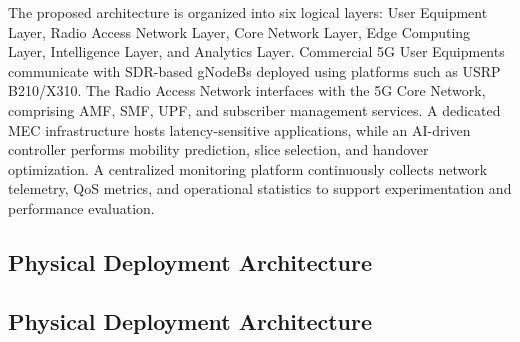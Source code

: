 \documentclass[12pt,a4paper]{article}
\begin{document}
The proposed architecture is organized into six logical layers: User Equipment Layer, Radio Access Network Layer, Core Network Layer, Edge Computing Layer, Intelligence Layer, and Analytics Layer. Commercial 5G User Equipments communicate with SDR-based gNodeBs deployed using platforms such as USRP B210/X310. The Radio Access Network interfaces with the 5G Core Network, comprising AMF, SMF, UPF, and subscriber management services. A dedicated MEC infrastructure hosts latency-sensitive applications, while an AI-driven controller performs mobility prediction, slice selection, and handover optimization. A centralized monitoring platform continuously collects network telemetry, QoS metrics, and operational statistics to support experimentation and performance evaluation.

\subsection{Physical Deployment Architecture}
\subsection{Physical Deployment Architecture}
\end{document}
